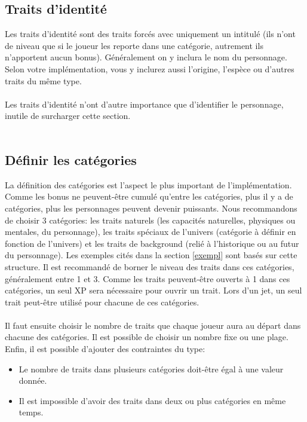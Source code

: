 \documentclass[a4paper,10pt,twoside,twocolumn]{article}
\begin{document}
 \subsection{Traits d'identité}
 \label{implem::traits}
 
 Les traits d'identité sont des traits forcés avec uniquement un intitulé (ils n'ont de niveau que si le joueur les reporte dans une catégorie, autrement ils n'apportent aucun bonus). Généralement on y inclura le nom du personnage. Selon votre implémentation, vous y inclurez aussi l'origine, l'espèce ou d'autres traits du même type.\\
 \\
 Les traits d'identité n'ont d'autre importance que d'identifier le personnage, inutile de surcharger cette section.\\
 \\
 
 \subsection{Définir les catégories}
 \label{implem::cat}
 
 La définition des catégories est l'aspect le plus important de l'implémentation. Comme les bonus ne peuvent-être cumulé qu'entre les catégories, plus il y a de catégories, plus les personnages peuvent devenir puissants. Nous recommandons de choisir 3 catégories: les traits naturels (les capacités naturelles, physiques ou mentales, du personnage), les traits spéciaux de l'univers (catégorie à définir en fonction de l'univers) et les traits de background (relié à l'historique ou au futur du personnage). Les exemples cités dans la section \ref{exempl} sont basés sur cette structure. Il est recommandé de borner le niveau des traits dans ces catégories, généralement entre 1 et 3. Comme les traits peuvent-être ouverts à 1 dans ces catégories, un seul XP sera nécessaire pour ouvrir un trait. Lors d'un jet, un seul trait peut-être utilisé pour chacune de ces catégories.\\
 \\
 Il faut ensuite choisir le nombre de traits que chaque joueur aura au départ dans chacune des catégories. Il est possible de choisir un nombre fixe ou une plage. Enfin, il est possible d'ajouter des contraintes du type:
 
 \begin{itemize}
  \item Le nombre de traits dans plusieurs catégories doit-être égal à une valeur donnée.
  \item Il est impossible d'avoir des traits dans deux ou plus catégories en même temps.
 \end{itemize}
\end{document}
